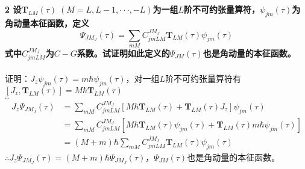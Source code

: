 \documentclass[12pt]{article}
\numberwithin{equation}{section}	 %
\begin{document}
\begin{spacing}{1.5}
\textbf{2 \quad 设$\bm{T}_{LM}(\tau) \; (M=L,L-1,\cdot\cdot\cdot,-L)$为一组$L$阶不可约张量算符，$\psi_{jm}(\tau)$为角动量本征函数，定义
\begin{equation}\nonumber 		%
\Psi_{JM_{J}}(\tau) = \sum_{mM}C_{jmLM}^{JM_{J}}\bm{T}_{LM}(\tau)\psi_{jm}(\tau)
\end{equation}
式中$C_{jmLM}^{JM_{J}}$为$C-G$系数。试证明如此定义的$\Psi_{JM}(\tau)$也是角动量的本征函数。}\\
~\\
证明：$J_{z}\psi_{jm}(\tau) = m\hbar\psi_{jm}(\tau)$，对一组$L$阶不可约张量算符有$\left[ J_{z},\bm{T}_{LM}(\tau) \right] = M\hbar\bm{T}_{LM}(\tau)$ \\
$\therefore$
\begin{align*}
J_{z}\Psi_{JM_{J}}(\tau) &= \sum_{mM}C_{jmLM}^{JM_{J}} \left[ M\hbar\bm{T}_{LM}(\tau) + \bm{T}_{LM}(\tau)J_{z} \right] \psi_{jm}(\tau) \\
&= \sum_{mM}C_{jmLM}^{JM_{J}} \left[ M\hbar\bm{T}_{LM}(\tau)\psi_{jm}(\tau) + \bm{T}_{LM}(\tau)m\hbar\psi_{jm}(\tau) \right] \\
&= \left(M+m\right)\hbar \sum_{mM}C_{jmLM}^{JM_{J}}\bm{T}_{LM}(\tau)\psi_{jm}(\tau)
\end{align*}
$\therefore \displaystyle J_{z}\Psi_{JM_{J}}(\tau) = \left(M+m\right)\hbar\Psi_{JM_{J}}(\tau)$，$\Psi_{JM}(\tau)$也是角动量的本征函数。
~\\
~\\




\end{spacing}
\end{document}
